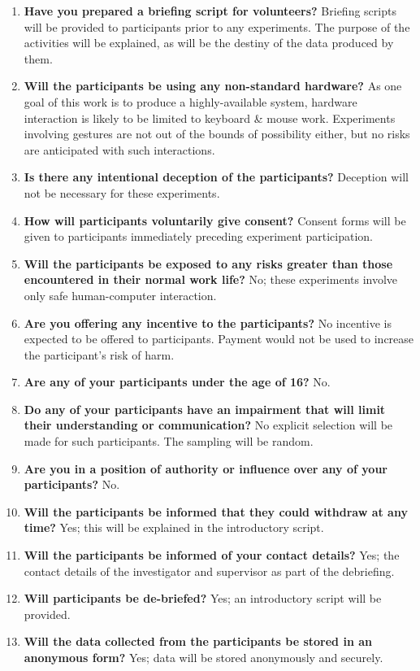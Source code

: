 \documentclass[a4paper, 11pt]{article}
\begin{document}
\newcommand{\ethitem}[2]{\item {\bfseries #1} #2}
\begin{enumerate}
\ethitem{Have you prepared a briefing script for volunteers?}{Briefing scripts will be provided to participants prior to any experiments. The purpose of the activities will be explained, as will be the destiny of the data produced by them.}
\ethitem{Will the participants be using any non-standard hardware?}{As one goal of this work is to produce a highly-available system, hardware interaction is likely to be limited to keyboard \& mouse work. Experiments involving gestures are not out of the bounds of possibility either, but no risks are anticipated with such interactions.}
\ethitem{Is there any intentional deception of the participants?}{Deception will not be necessary for these experiments.}
\ethitem{How will participants voluntarily give consent?}{Consent forms will be given to participants immediately preceding experiment participation.}
\ethitem{Will the participants be exposed to any risks greater than those encountered in their normal work life?}{No; these experiments involve only safe human-computer interaction.}
\ethitem{Are you offering any incentive to the participants?}{No incentive is expected to be offered to participants. Payment would not be used to increase the participant's risk of harm.}
\ethitem{Are any of your participants under the age of 16?}{No.}
\ethitem{Do any of your participants have an impairment that will limit their understanding or communication?}{No explicit selection will be made for such participants. The sampling will be random.}
\ethitem{Are you in a position of authority or influence over any of your participants?}{No.}
\ethitem{Will the participants be informed that they could withdraw at any time?}{Yes; this will be explained in the introductory script.}
\ethitem{Will the participants be informed of your contact details?}{Yes; the contact details of the investigator and supervisor as part of the debriefing.}
\ethitem{Will participants be de-briefed?}{Yes; an introductory script will be provided.}
\ethitem{Will the data collected from the participants be stored in an anonymous form?}{Yes; data will be stored anonymously and securely.}
\end{enumerate}
\newcommand{\signature}[2]{\textbf{\textsc{#1:}} #2~\leaders\hbox{\rule{1pt}{1pt}}\hfill~\\~\\}
\end{document}
